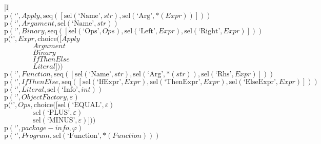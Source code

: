 \footnotesize\begin{center}\begin{tabular}{|l|}\hline
{}
\\\hline
$\mathrm{p}(\text{`'},\mathit{Apply},\mathrm{seq}\left(\left[\mathrm{sel}\left(\text{`Name'},str\right), \mathrm{sel}\left(\text{`Arg'},{*}\left(\mathit{Expr}\right)\right)\right]\right))$	\\
$\mathrm{p}(\text{`'},\mathit{Argument},\mathrm{sel}\left(\text{`Name'},str\right))$	\\
$\mathrm{p}(\text{`'},\mathit{Binary},\mathrm{seq}\left(\left[\mathrm{sel}\left(\text{`Ops'},\mathit{Ops}\right), \mathrm{sel}\left(\text{`Left'},\mathit{Expr}\right), \mathrm{sel}\left(\text{`Right'},\mathit{Expr}\right)\right]\right))$	\\
$\mathrm{p}(\text{`'},\mathit{Expr},\mathrm{choice}([\mathit{Apply}$\\$\qquad\qquad\mathit{Argument}$\\$\qquad\qquad\mathit{Binary}$\\$\qquad\qquad\mathit{IfThenElse}$\\$\qquad\qquad\mathit{Literal}]))$	\\
$\mathrm{p}(\text{`'},\mathit{Function},\mathrm{seq}\left(\left[\mathrm{sel}\left(\text{`Name'},str\right), \mathrm{sel}\left(\text{`Arg'},{*}\left(str\right)\right), \mathrm{sel}\left(\text{`Rhs'},\mathit{Expr}\right)\right]\right))$	\\
$\mathrm{p}(\text{`'},\mathit{IfThenElse},\mathrm{seq}\left(\left[\mathrm{sel}\left(\text{`IfExpr'},\mathit{Expr}\right), \mathrm{sel}\left(\text{`ThenExpr'},\mathit{Expr}\right), \mathrm{sel}\left(\text{`ElseExpr'},\mathit{Expr}\right)\right]\right))$	\\
$\mathrm{p}(\text{`'},\mathit{Literal},\mathrm{sel}\left(\text{`Info'},int\right))$	\\
$\mathrm{p}(\text{`'},\mathit{ObjectFactory},\varepsilon)$	\\
$\mathrm{p}(\text{`'},\mathit{Ops},\mathrm{choice}([\mathrm{sel}\left(\text{`EQUAL'},\varepsilon\right)$\\$\qquad\qquad\mathrm{sel}\left(\text{`PLUS'},\varepsilon\right)$\\$\qquad\qquad\mathrm{sel}\left(\text{`MINUS'},\varepsilon\right)]))$	\\
$\mathrm{p}(\text{`'},\mathit{package-info},\varphi)$	\\
$\mathrm{p}(\text{`'},\mathit{Program},\mathrm{sel}\left(\text{`Function'},{*}\left(\mathit{Function}\right)\right))$	\\
\hline\end{tabular}\end{center}



